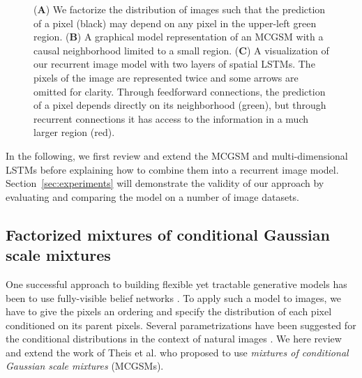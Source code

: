 \documentclass{article}
\begin{document}
\begin{figure}
 			\caption{(\textbf{A}) We factorize the distribution of images such that the prediction
				of a pixel (black) may depend on any pixel in the upper-left green region. (\textbf{B}) A graphical model representation of an MCGSM with a
				causal neighborhood limited to a small region. (\textbf{C}) A visualization of our recurrent image model with two layers of spatial LSTMs.
				The pixels of the image are represented twice and some
				arrows are omitted for clarity. Through feedforward connections, the prediction of a pixel depends
				directly on its neighborhood (green), but through recurrent connections it has
				access to the information in a much larger region (red).}
			\label{fig:rim}
		\end{figure}
		In the following, we first review and extend the MCGSM \cite{Theis:2012a} and
		multi-dimensional LSTMs \cite{Graves:2009} before explaining how to combine them into
		a recurrent image model. Section~\ref{sec:experiments} will demonstrate
		the validity of our approach by evaluating and comparing the model on a number of image datasets.

		\subsection{Factorized mixtures of conditional Gaussian scale mixtures}
		\label{sec:mcgsm}
		One successful approach to building flexible yet tractable generative models has been to
		use fully-visible belief networks \cite{Neal:1992,Larochelle:2011}. To apply
		such a model to images, we have to give the pixels an ordering and specify the
		distribution of each pixel conditioned on its parent pixels. Several parametrizations
		have been suggested for the conditional distributions in the context of natural images \cite{Domke:2008,Hosseini:2010,Theis:2012a,Uria:2013,Uria:2014}.
		We here review and extend the work of Theis et al. \cite{Theis:2012a} who proposed
		to use \textit{mixtures of conditional Gaussian scale mixtures} (MCGSMs).
\end{document}
